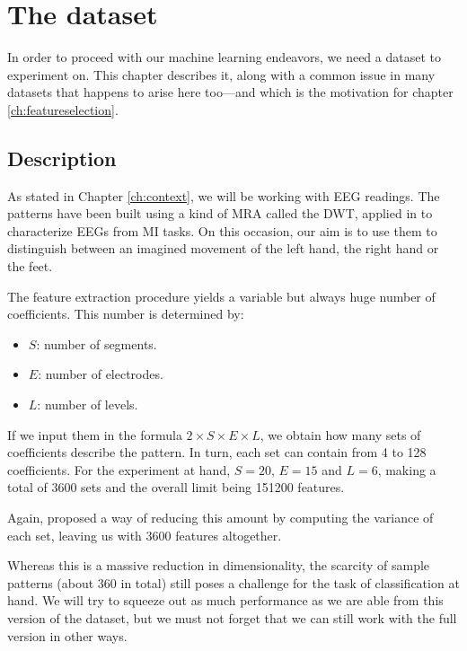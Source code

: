 \chapter{The dataset}\label{ch:dataset}

In order to proceed with our machine learning endeavors, we need a dataset to experiment on. This chapter describes it, along with a common issue in many datasets that happens to arise here too---and which is the motivation for chapter \ref{ch:featureselection}.

\section{Description}

	As stated in Chapter \ref{ch:context}, we will be working with \acs{EEG} readings. The patterns have been built using a kind of \ac{MRA} \cite{daubechies1992ten} called the \ac{DWT}, applied in \cite{asensio2013multiresolution} to characterize \acs{EEG}s from \ac{MI} tasks. On this occasion, our aim is to use them to distinguish between an imagined movement of the left hand, the right hand or the feet.

	The feature extraction procedure yields a variable but always huge number of coefficients. This number is determined by:

	\begin{itemize}

		\item
		$S$: number of segments.

		\item
		$E$: number of electrodes.

		\item
		$L$: number of levels.

	\end{itemize}

	If we input them in the formula $2 \times S \times E \times L$, we obtain how many sets of coefficients describe the pattern. In turn, each set can contain from 4 to 128 coefficients. For the experiment at hand, $S = 20$, $E = 15$ and $L = 6$, making a total of 3600 sets and the overall limit being 151200 features.

	Again, \cite{asensio2013multiresolution} proposed a way of reducing this amount by computing the variance of each set, leaving us with 3600 features altogether.

	Whereas this is a massive reduction in dimensionality, the scarcity of sample patterns (about 360 in total) still poses a challenge for the task of classification at hand. We will try to squeeze out as much performance as we are able from this version of the dataset, but we must not forget that we can still work with the full version in other ways.

